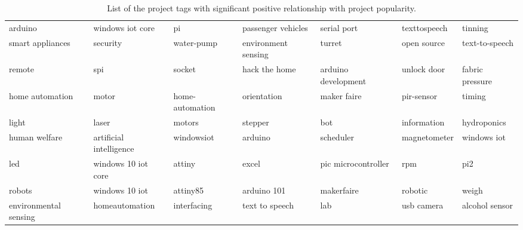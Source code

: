 \begin{table*}[t]
	\centering
	\caption{List of the project tags with significant positive relationship with project popularity.}
		\setlength{\tabcolsep}{4pt}
	\label{table:tags}
	\begin{tabular}{|l:l:l:l:l:l:l|}
		\hline%
		
		arduino               & windows iot core        & pi              & passenger vehicles  & serial port         & texttospeech & tinning                \\
		smart appliances      & security                & water-pump      & environment sensing & turret              & open source  & text-to-speech         \\
		remote                & spi                     & socket          & hack the home       & arduino development & unlock door  & fabric pressure \\
		home automation       & motor                   & home-automation & orientation         & maker faire         & pir-sensor   & timing                 \\
		light                 & laser                   & motors          & stepper             & bot                 & information  & hydroponics            \\
		human welfare         & artificial intelligence & windowsiot      & arduino             & scheduler           & magnetometer & windows iot            \\
		led                   & windows 10 iot core     & attiny          & excel               & pic microcontroller & rpm          & pi2                    \\
		robots                & windows 10 iot          & attiny85        & arduino 101         & makerfaire          & robotic      & weigh                  \\
		environmental sensing & homeautomation          & interfacing     & text to speech      & lab                 & usb camera   & alcohol sensor     \\
		\hline       
	\end{tabular}
\end{table*}